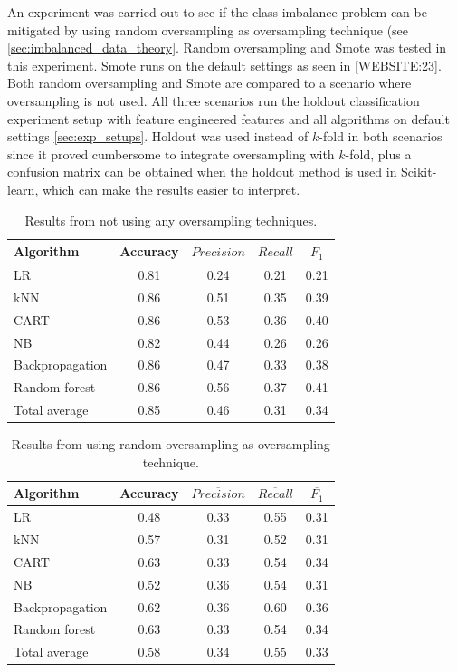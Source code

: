 	An experiment was carried out to see if the class imbalance problem can be mitigated by using random oversampling as oversampling technique (see \ref{sec:imbalanced_data_theory}. Random oversampling and Smote was tested in this experiment. Smote runs on the default settings as seen in \ref{WEBSITE:23}. Both random oversampling and Smote are compared to a scenario where oversampling is not used. All three scenarios run the holdout classification experiment setup with feature engineered features and all algorithms on default settings \ref{sec:exp_setups}. Holdout was used instead of $k$-fold in both scenarios since it proved cumbersome to integrate oversampling with $k$-fold, plus a confusion matrix can be obtained when the holdout method is used in Scikit-learn, which can make the results easier to interpret. 

	\begin{table}[H]
	\centering
	\caption{Results from not using any oversampling techniques. }
		\begin{tabular}[5]{l | c | c | c | c}
    			Algorithm & Accuracy & $\overline{Precision}$ & $\overline{Recall}$ & $\overline{F_1}$ \\
    			\hline
			LR & 0.81 & 0.24 & 0.21 & 0.21  \\
			kNN & 0.86 & 0.51 & 0.35 & 0.39  \\
			CART & 0.86 & 0.53 & 0.36 & 0.40 \\
			NB & 0.82 & 0.44 & 0.26 & 0.26  \\
			Backpropagation & 0.86 & 0.47 & 0.33 &  0.38  \\
			Random forest & 0.86 & 0.56 & 0.37 & 0.41  \\
			\hline
			Total average & 0.85 & 0.46 & 0.31 & 0.34
			\label{table:no_oversampling}
		\end{tabular}
	\end{table}

	\begin{table}[H]
	\centering
	\caption{Results from using random oversampling as oversampling technique.}
		\begin{tabular}[5]{l | c | c | c | c}
    			Algorithm & Accuracy & $\overline{Precision}$ & $\overline{Recall}$ & $\overline{F_1}$ \\
    			\hline
			LR & 0.48 & 0.33 & 0.55 & 0.31 \\
			kNN & 0.57 &  0.31 & 0.52 &  0.31 \\
			CART & 0.63 & 0.33 & 0.54 &  0.34 \\
			NB &  0.52 & 0.36 & 0.54 & 0.31 \\
			Backpropagation & 0.62 & 0.36 & 0.60 & 0.36 \\
			Random forest & 0.63 & 0.33 & 0.54 &  0.34 \\
			\hline
			Total average & 0.58 & 0.34 & 0.55 & 0.33 
			\label{table:random_oversampling}
		\end{tabular}
	\end{table}

